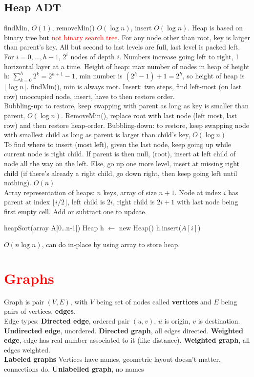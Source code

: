 \subsection{Heap ADT} findMin, $O(1)$, removeMin() $O(\log n)$, insert $O(\log n)$. Heap is based on binary tree but \textcolor{Red}{not binary search tree}. For any node other than root, key is larger than parent's key. All but second to last levels are full, last level is packed left. For $i=0,\ldots,h-1$, $2^i$ nodes of depth $i$. Numbers increase going left to right, 1 horizontal layer at a time. Height of heap: max number of nodes in heap of height h: $\sum_{k=0}^h 2^k = 2^{h+1}-1$, min number is $(2^h-1)+1=2^h$, so height of heap is $\lfloor \log n \rfloor$. findMin(), min is always root. Insert: two steps, find left-most (on last row) unoccupied node, insert, have to then restore order.
\\ Bubbling-up: to restore, keep swapping with parent as long as key is smaller than parent, $O(\log n)$. RemoveMin(), replace root with last node (left most, last row) and then  restore heap-order. Bubbling-down: to restore, keep swapping node with smallest child as long as parent is larger than child's key, $O(\log n)$
\\ To find where to insert (most left), given the last node, keep going up while current node is right child. If parent is then null, (root), insert at left child of node all the way on the left. Else, go up one more level, insert at missing right child (if there's already a right child, go down right, then keep going left until nothing). $O(n)$
\\ Array representation of heaps: $n$ keys, array of size $n+1$. Node at index $i$ has parent at index $\lfloor i/2 \rfloor$, left child is $2i$, right child is $2i+1$ with last node being first empty cell. Add or subtract one to update.
\begin{algorithmic}
  \State heapSort(array A[0\ldots n-1])
  \State Heap h $\gets$ new Heap()
  \State h.insert($A[i]$)
  \EndFor
  \EndFor
\end{algorithmic}
$O(n\log n)$, can do in-place by using array to store heap.
\color{Red}
\section{\textcolor{Red}{Graphs}}
Graph is pair $(V,E)$, with $V$ being set of nodes called \textbf{vertices} and $E$ being pairs of vertices, \textbf{edges}.
\\ Edge types: \textbf{Directed edge}, ordered pair $(u,v)$, $u$ is origin, $v$ is destination. \textbf{Undirected edge}, unordered. \textbf{Directed graph}, all edges directed. \textbf{Weighted edge}, edge has real number associated to it (like distance). \textbf{Weighted graph}, all edges weighted.
\\ \textbf{Labeled graphs} Vertices have names, geometric layout doesn't matter, connections do. \textbf{Unlabelled graph}, no names
\vspace{-7 pt}
